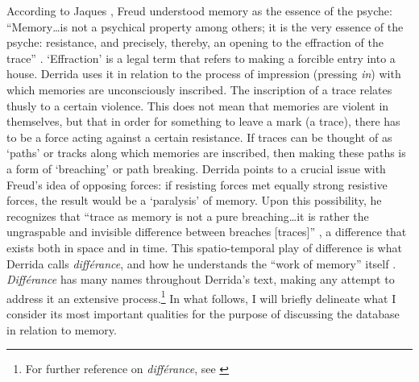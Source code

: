 
According to Jaques \textcite{Der78:Wri}, Freud understood memory as the essence of the psyche: ``Memory\dots is not a psychical property among others; it is the very essence of the psyche: resistance, and precisely, thereby, an opening to the effraction of the trace'' \parencite[201]{Der78:Wri}. `Effraction' is a legal term that refers to making a forcible entry into a house. Derrida uses it in relation to the process of impression (pressing \textit{in}) with which memories are unconsciously inscribed. The inscription of a trace relates thusly to a certain violence. This does not mean that memories are violent in themselves, but that in order for something to leave a mark (a trace), there has to be a force acting against a certain resistance. If traces can be thought of as `paths' or tracks along which memories are inscribed, then making these paths is a form of `breaching' or path breaking. Derrida points to a crucial issue with Freud's idea of opposing forces: if resisting forces met equally strong resistive forces, the result would be a `paralysis' of memory. Upon this possibility, he recognizes that ``trace as memory is not a pure breaching\dots it is rather the ungraspable and invisible difference between breaches [traces]'' \parencite[201]{Der78:Wri}, a difference that exists both in space and in time. This spatio-temporal play of difference is what Derrida calls \textit{différance}, and how he understands the ``work of memory'' itself \parencite[226]{Der78:Wri}. \textit{Différance} has many names throughout Derrida's text, making any attempt to address it an extensive process.\footnote{For further reference on \textit{différance}, see \parencites[71-72]{Gra15:The}[219]{Der78:Wri}{Der82:Mar}} In what follows, I will briefly delineate what I consider its most important qualities for the purpose of discussing the database in relation to memory.

